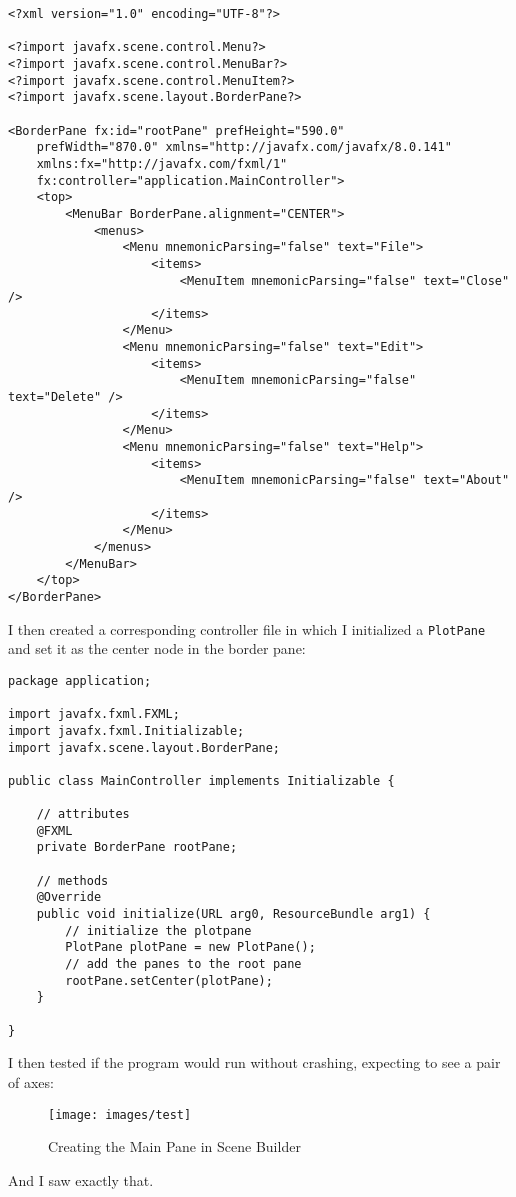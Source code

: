 \documentclass[../../../../main.tex]{subfiles}
\begin{document}
\begin{verbatim}
<?xml version="1.0" encoding="UTF-8"?>

<?import javafx.scene.control.Menu?>
<?import javafx.scene.control.MenuBar?>
<?import javafx.scene.control.MenuItem?>
<?import javafx.scene.layout.BorderPane?>

<BorderPane fx:id="rootPane" prefHeight="590.0"
	prefWidth="870.0" xmlns="http://javafx.com/javafx/8.0.141"
	xmlns:fx="http://javafx.com/fxml/1"
	fx:controller="application.MainController">
	<top>
		<MenuBar BorderPane.alignment="CENTER">
			<menus>
				<Menu mnemonicParsing="false" text="File">
					<items>
						<MenuItem mnemonicParsing="false" text="Close" />
					</items>
				</Menu>
				<Menu mnemonicParsing="false" text="Edit">
					<items>
						<MenuItem mnemonicParsing="false" text="Delete" />
					</items>
				</Menu>
				<Menu mnemonicParsing="false" text="Help">
					<items>
						<MenuItem mnemonicParsing="false" text="About" />
					</items>
				</Menu>
			</menus>
		</MenuBar>
	</top>
</BorderPane>
\end{verbatim}
\newpage \noindent
I then created a corresponding controller file in which I initialized a \texttt{PlotPane} and set it as the center node in the border pane:
\begin{verbatim}
package application;

import javafx.fxml.FXML;
import javafx.fxml.Initializable;
import javafx.scene.layout.BorderPane;

public class MainController implements Initializable {
	
	// attributes
	@FXML
	private BorderPane rootPane;
	
	// methods
	@Override
	public void initialize(URL arg0, ResourceBundle arg1) {
		// initialize the plotpane
		PlotPane plotPane = new PlotPane();
		// add the panes to the root pane
		rootPane.setCenter(plotPane);
	}

}
\end{verbatim}
I then tested if the program would run without crashing, expecting to see a pair of axes:
\begin{figure}[H]
	\begin{center}
		\texttt{[image: images/test]}
	\end{center}
	\caption{Creating the Main Pane in Scene Builder}
\end{figure}
And I saw exactly that.
\newpage
\end{document}
